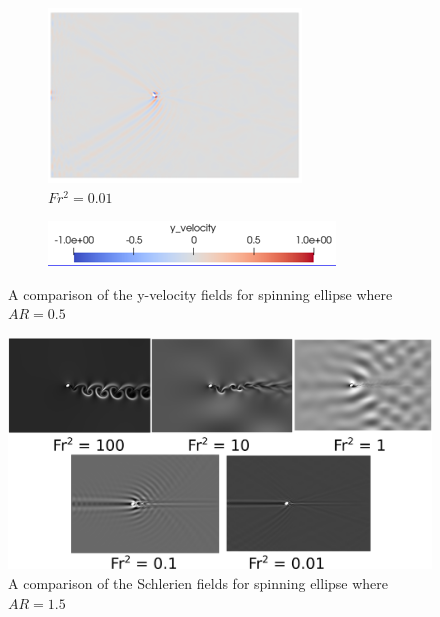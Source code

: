 \begin{figure}
\begin{subfigure}[b]{0.32\textwidth}
        \includegraphics[width=\textwidth]{images/spinning_ellipse/ar0p5fr0p1.png}
        \caption{$Fr^2 = 0.01$}
        \label{fig:ar0p5fr0p1}
    \end{subfigure}
    
    \begin{subfigure}[b]{0.32\textwidth}
        \centering
        \includegraphics[width=\textwidth]{images/spinning_ellipse/scale1.png}
        \caption*{}
    \end{subfigure}
    
    \caption{A comparison of the y-velocity fields for spinning ellipse where $AR = 0.5$}
    \label{fig:ar0p5 y-vel}
\end{figure}
\begin{figure}
    \centering
    \includegraphics[width = \textwidth]{images/spinning_ellipse/schlerienar1p5.png}
    \caption{A comparison of the Schlerien fields for spinning ellipse where $AR = 1.5$}
    \label{fig:schlerienar1p5}
\end{figure}

